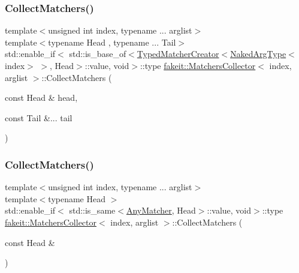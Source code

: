 \mbox{\label{classfakeit_1_1MatchersCollector_a40994e9802e933fb1bae91870d666dcb}} 
\subsubsection{\texorpdfstring{CollectMatchers()}{CollectMatchers()}\hspace{0.1cm}{\footnotesize\ttfamily [61/63]}}
{\footnotesize\ttfamily template$<$unsigned int index, typename ... arglist$>$ \\
template$<$typename Head , typename ... Tail$>$ \\
std\+::enable\+\_\+if$<$ std\+::is\+\_\+base\+\_\+of$<$\mbox{\hyperlink{structfakeit_1_1TypedMatcherCreator}{Typed\+Matcher\+Creator}}$<$\mbox{\hyperlink{classfakeit_1_1MatchersCollector_aeda8ced6a2f0cb7c6e4f916f18a91730}{Naked\+Arg\+Type}}$<$index$>$ $>$, Head$>$\+::value, void$>$\+::type \mbox{\hyperlink{classfakeit_1_1MatchersCollector}{fakeit\+::\+Matchers\+Collector}}$<$ index, arglist $>$\+::Collect\+Matchers (\begin{DoxyParamCaption}\item[{const Head \&}]{head,  }\item[{const Tail \&...}]{tail }\end{DoxyParamCaption})\hspace{0.3cm}{\ttfamily [inline]}}

\mbox{\label{classfakeit_1_1MatchersCollector_a89350af9ba2e7aaead8bd7b007f03631}} 
\subsubsection{\texorpdfstring{CollectMatchers()}{CollectMatchers()}\hspace{0.1cm}{\footnotesize\ttfamily [62/63]}}
{\footnotesize\ttfamily template$<$unsigned int index, typename ... arglist$>$ \\
template$<$typename Head $>$ \\
std\+::enable\+\_\+if$<$ std\+::is\+\_\+same$<$\mbox{\hyperlink{structfakeit_1_1AnyMatcher}{Any\+Matcher}}, Head$>$\+::value, void$>$\+::type \mbox{\hyperlink{classfakeit_1_1MatchersCollector}{fakeit\+::\+Matchers\+Collector}}$<$ index, arglist $>$\+::Collect\+Matchers (\begin{DoxyParamCaption}\item[{const Head \&}]{ }\end{DoxyParamCaption})\hspace{0.3cm}{\ttfamily [inline]}}

